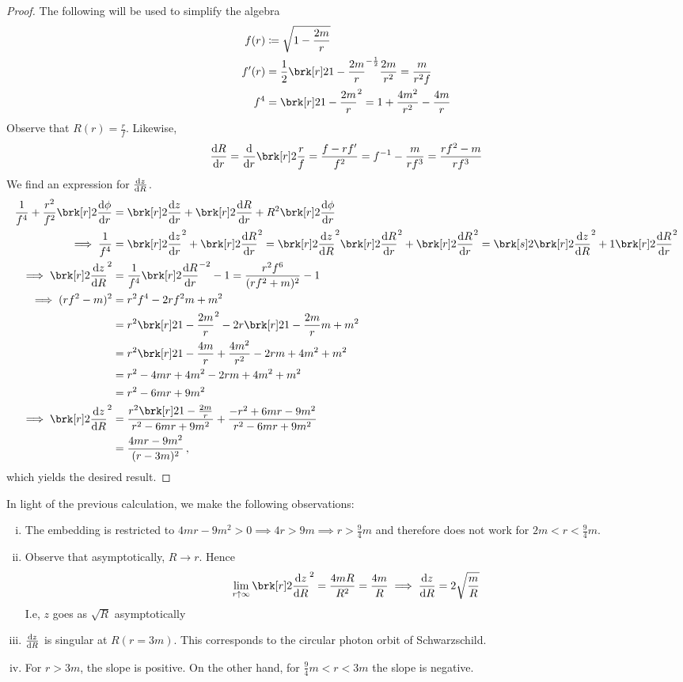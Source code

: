 \begin{proof}
The following will be used to simplify the algebra
\begin{align*}
f(r) &\defn \sqrt{1 - \frac{2m}{r}} \\
f'(r) &= \frac{1}{2}\brk[r]2{1-\frac{2m}{r}}^{-\frac{1}{2}}\frac{2m}{r^2} = \frac{m}{r^2f} \\
f^4 &= \brk[r]2{1 - \frac{2m}{r}}^2 = 1 + \frac{4m^2}{r^2} - \frac{4m}{r}
\end{align*}
Observe that $R(r) = \frac{r}{f}$. Likewise,
\begin{equation}\label{}
\diff{R}{r} = \diff{}{r} \brk[r]2{\frac{r}{f}} = \frac{f - rf'}{f^2} = f^{-1} - \frac{m}{rf^3} = \frac{rf^2 - m}{rf^3}
\end{equation}
We find an expression for $\diff{z}{R}$.
\begin{align*}
\frac{1}{f^4} + \frac{r^2}{f^2} \brk[r]2{\diff{\phi}{r}} &= \brk[r]2{\diff{z}{r}} + \brk[r]2{\diff{R}{r}} + R^2 \brk[r]2{\diff{\phi}{r}} \\
\implies \frac{1}{f^4} &= \brk[r]2{\diff{z}{r}}^2 + \brk[r]2{\diff{R}{r}}^2 = \brk[r]2{\diff{z}{R}}^2 \brk[r]2{\diff{R}{r}}^2 + \brk[r]2{\diff{R}{r}}^2 = \brk[s]2{\brk[r]2{\diff{z}{R}}^2 + 1}\brk[r]2{\diff{R}{r}}^2 \\
\implies \brk[r]2{\diff{z}{R}}^2 &= \frac{1}{f^4} \brk[r]2{\diff{R}{r}}^{-2} - 1 = \frac{r^2 f^6}{(rf^2 + m)^2} - 1 \\
\implies (rf^2-m)^2 &= r^2f^4 - 2rf^2m + m^2 \\
&= r^2 \brk[r]2{1 - \frac{2m}{r}^2} - 2r \brk[r]2{1 - \frac{2m}{r}}m + m^2 \\
&= r^2 \brk[r]2{1 - \frac{4m}{r} + \frac{4m^2}{r^2}} - 2rm + 4m^2 + m^2 \\
&= r^2 - 4mr + 4m^2 - 2rm + 4m^2 + m^2 \\
&= r^2 - 6mr + 9m^2 \\
\implies \brk[r]2{\diff{z}{R}}^2 &= \frac{r^2 \brk[r]2{1 - \frac{2m}{r}}}{r^2 - 6mr + 9m^2} + \frac{-r^2 + 6mr - 9m^2}{r^2 - 6mr + 9m^2} \\
&= \frac{4mr - 9m^2}{(r-3m)^2} \, ,
\end{align*}
which yields the desired result.
\end{proof}
In light of the previous calculation, we make the following observations:
\begin{enumerate}[i)]
\item The embedding is restricted to $4mr - 9m^2 > 0 \implies 4r > 9m \implies r > \frac{9}{4}m$ and therefore does not work for $2m < r < \frac{9}{4}m$.
\item Observe that asymptotically, $R \rightarrow r$. Hence
\begin{equation}\label{}
\lim_{r \uparrow \infty} \brk[r]2{\diff{z}{R}}^2 = \frac{4mR}{R^2} = \frac{4m}{R} \implies \diff{z}{R} = 2\sqrt{\frac{m}{R}}
\end{equation}
I.e, $z$ goes as $\sqrt{R}$ asymptotically
\item
$\diff{z}{R}$ is singular at $R(r=3m)$. This corresponds to the circular photon orbit of Schwarzschild.
\item
For $r>3m$, the slope is positive. On the other hand, for $\frac{9}{4}m < r < 3m$ the slope is negative.
\end{enumerate}
